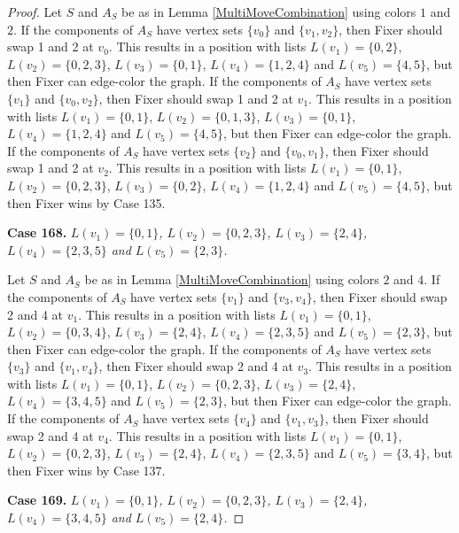 \documentclass[12pt]{amsart}
\theoremstyle{plain}
\theoremstyle{definition}
\theoremstyle{remark}
\begin{document}
\begin{proof}
Let $S$ and $A_S$ be as in Lemma \ref{MultiMoveCombination} using colors $1$ and $2$. If the components of $A_S$ have vertex sets $\{v_0\}$ and $\{v_1, v_2\}$, then Fixer should swap 1 and 2 at $v_0$. This results in a position with lists $L(v_1) = \{0, 2\}$, $L(v_2) = \{0, 2, 3\}$, $L(v_3) = \{0, 1\}$, $L(v_4) = \{1, 2, 4\}$ and $L(v_5) = \{4, 5\}$, but then Fixer can edge-color the graph.
If the components of $A_S$ have vertex sets $\{v_1\}$ and $\{v_0, v_2\}$, then Fixer should swap 1 and 2 at $v_1$. This results in a position with lists $L(v_1) = \{0, 1\}$, $L(v_2) = \{0, 1, 3\}$, $L(v_3) = \{0, 1\}$, $L(v_4) = \{1, 2, 4\}$ and $L(v_5) = \{4, 5\}$, but then Fixer can edge-color the graph.
If the components of $A_S$ have vertex sets $\{v_2\}$ and $\{v_0, v_1\}$, then Fixer should swap 1 and 2 at $v_2$. This results in a position with lists $L(v_1) = \{0, 1\}$, $L(v_2) = \{0, 2, 3\}$, $L(v_3) = \{0, 2\}$, $L(v_4) = \{1, 2, 4\}$ and $L(v_5) = \{4, 5\}$, but then Fixer wins by Case 135.

\noindent\textbf{Case 168.  }\textit{$L(v_1) = \{0, 1\}$, $L(v_2) = \{0, 2, 3\}$, $L(v_3) = \{2, 4\}$, $L(v_4) = \{2, 3, 5\}$ and $L(v_5) = \{2, 3\}$.}

Let $S$ and $A_S$ be as in Lemma \ref{MultiMoveCombination} using colors $2$ and $4$. If the components of $A_S$ have vertex sets $\{v_1\}$ and $\{v_3, v_4\}$, then Fixer should swap 2 and 4 at $v_1$. This results in a position with lists $L(v_1) = \{0, 1\}$, $L(v_2) = \{0, 3, 4\}$, $L(v_3) = \{2, 4\}$, $L(v_4) = \{2, 3, 5\}$ and $L(v_5) = \{2, 3\}$, but then Fixer can edge-color the graph.
If the components of $A_S$ have vertex sets $\{v_3\}$ and $\{v_1, v_4\}$, then Fixer should swap 2 and 4 at $v_3$. This results in a position with lists $L(v_1) = \{0, 1\}$, $L(v_2) = \{0, 2, 3\}$, $L(v_3) = \{2, 4\}$, $L(v_4) = \{3, 4, 5\}$ and $L(v_5) = \{2, 3\}$, but then Fixer can edge-color the graph.
If the components of $A_S$ have vertex sets $\{v_4\}$ and $\{v_1, v_3\}$, then Fixer should swap 2 and 4 at $v_4$. This results in a position with lists $L(v_1) = \{0, 1\}$, $L(v_2) = \{0, 2, 3\}$, $L(v_3) = \{2, 4\}$, $L(v_4) = \{2, 3, 5\}$ and $L(v_5) = \{3, 4\}$, but then Fixer wins by Case 137.

\noindent\textbf{Case 169.  }\textit{$L(v_1) = \{0, 1\}$, $L(v_2) = \{0, 2, 3\}$, $L(v_3) = \{2, 4\}$, $L(v_4) = \{3, 4, 5\}$ and $L(v_5) = \{2, 4\}$.}


\end{proof}
\end{document}
